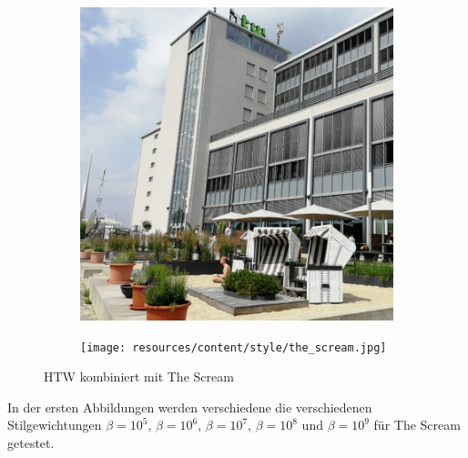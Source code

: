 \begin{figure}[H]
    \centering
    \begin{subfigure}[h]{0.20\textwidth}
        \centering
        \includegraphics[width=\textwidth]{resources/content/content/htw-768x768.jpg}
    \end{subfigure}
    \begin{subfigure}[h]{0.20\textwidth}
        \centering
        \texttt{[image: resources/content/style/the\_scream.jpg]}
    \end{subfigure}
    \caption{HTW kombiniert mit The Scream}
\end{figure}


In der ersten Abbildungen werden verschiedene die verschiedenen  \\
Stilgewichtungen $ \beta = 10^{5} $, $ \beta = 10^{6} $, $ \beta = 10^{7} $, $ \beta = 10^{8} $ und $ \beta = 10^{9} $ für The Scream getestet.

